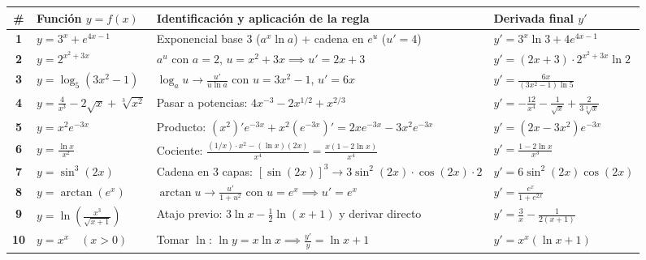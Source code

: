 \documentclass[10pt,a4paper]{article}
\begin{document}
\begin{center}
\renewcommand{\arraystretch}{1.48}
\footnotesize
\begin{tabularx}{\linewidth}{@{}c l >{\raggedright\arraybackslash}X >{\raggedright\arraybackslash}X@{}}
\toprule
\textbf{\#} & \textbf{Función $y = f(x)$} & \textbf{Identificación y aplicación de la regla} & \textbf{Derivada final $y'$} \\
\midrule
\textbf{1} & $y = 3^x + e^{4x-1}$ & Exponencial base $3$ ($a^x \ln a$) + cadena en $e^u$ ($u'=4$) & $y' = 3^x \ln 3 + 4e^{4x-1}$ \\
\textbf{2} & $y = 2^{x^2 + 3x}$ & $a^u$ con $a=2$, $u = x^2+3x \implies u'=2x+3$ & $y' = (2x+3)\cdot 2^{x^2+3x}\ln 2$ \\
\textbf{3} & $y = \log_5(3x^2 - 1)$ & $\log_a u \to \frac{u'}{u\ln a}$ con $u = 3x^2-1$, $u' = 6x$ & $\displaystyle y' = \frac{6x}{(3x^2-1)\ln 5}$ \\
\textbf{4} & $y = \frac{4}{x^3} - 2\sqrt{x} + \sqrt[3]{x^2}$ & Pasar a potencias: $4x^{-3} - 2x^{1/2} + x^{2/3}$ & $\displaystyle y' = -\frac{12}{x^4} - \frac{1}{\sqrt{x}} + \frac{2}{3\sqrt[3]{x}}$ \\
\textbf{5} & $y = x^2 e^{-3x}$ & Producto: $(x^2)'e^{-3x} + x^2(e^{-3x})' = 2xe^{-3x} - 3x^2 e^{-3x}$ & $y' = (2x - 3x^2)e^{-3x}$ \\
\textbf{6} & $y = \frac{\ln x}{x^2}$ & Cociente: $\frac{(1/x)\cdot x^2 - (\ln x)(2x)}{x^4} = \frac{x(1 - 2\ln x)}{x^4}$ & $\displaystyle y' = \frac{1 - 2\ln x}{x^3}$ \\
\textbf{7} & $y = \sin^3(2x)$ & Cadena en 3 capas: $[\sin(2x)]^3 \to 3\sin^2(2x)\cdot\cos(2x)\cdot 2$ & $y' = 6\sin^2(2x)\cos(2x)$ \\
\textbf{8} & $y = \arctan(e^x)$ & $\arctan u \to \frac{u'}{1+u^2}$ con $u = e^x \implies u' = e^x$ & $\displaystyle y' = \frac{e^x}{1 + e^{2x}}$ \\
\textbf{9} & $y = \ln\!\left(\frac{x^3}{\sqrt{x+1}}\right)$ & Atajo previo: $3\ln x - \frac{1}{2}\ln(x+1)$ y derivar directo & $\displaystyle y' = \frac{3}{x} - \frac{1}{2(x+1)}$ \\
\textbf{10} & $y = x^x \quad (x > 0)$ & Tomar $\ln$: $\ln y = x\ln x \implies \frac{y'}{y} = \ln x + 1$ & $y' = x^x(\ln x + 1)$ \\
\bottomrule
\end{tabularx}
\end{center}
\end{document}
